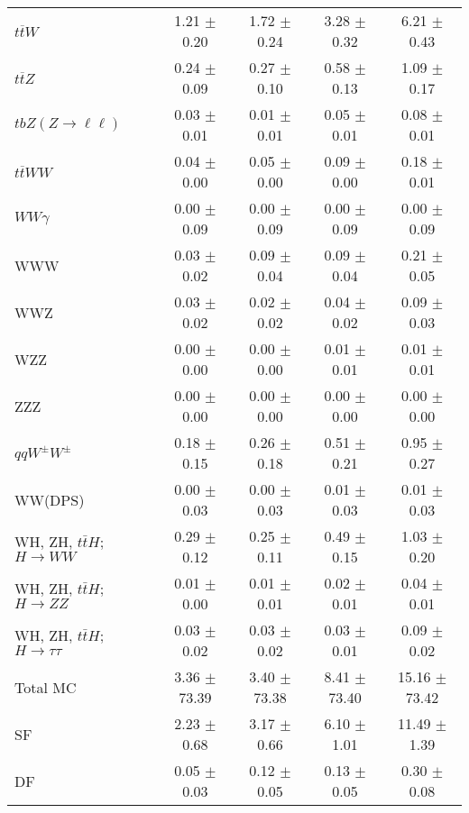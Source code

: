 \begin{tabular}{l|cccc}
                   $t\overline{t}W$ &  1.21 $\pm$  0.20 &  1.72 $\pm$  0.24 &  3.28 $\pm$  0.32 &  6.21 $\pm$  0.43 \\
                   $t\overline{t}Z$ &  0.24 $\pm$  0.09 &  0.27 $\pm$  0.10 &  0.58 $\pm$  0.13 &  1.09 $\pm$  0.17 \\
    $tbZ (Z \rightarrow \ell \ell)$ &  0.03 $\pm$  0.01 &  0.01 $\pm$  0.01 &  0.05 $\pm$  0.01 &  0.08 $\pm$  0.01 \\
                  $t\overline{t}WW$ &  0.04 $\pm$  0.00 &  0.05 $\pm$  0.00 &  0.09 $\pm$  0.00 &  0.18 $\pm$  0.01 \\
                         $WW\gamma$ &  0.00 $\pm$  0.09 &  0.00 $\pm$  0.09 &  0.00 $\pm$  0.09 &  0.00 $\pm$  0.09 \\
                                WWW &  0.03 $\pm$  0.02 &  0.09 $\pm$  0.04 &  0.09 $\pm$  0.04 &  0.21 $\pm$  0.05 \\
                                WWZ &  0.03 $\pm$  0.02 &  0.02 $\pm$  0.02 &  0.04 $\pm$  0.02 &  0.09 $\pm$  0.03 \\
                                WZZ &  0.00 $\pm$  0.00 &  0.00 $\pm$  0.00 &  0.01 $\pm$  0.01 &  0.01 $\pm$  0.01 \\
                                ZZZ &  0.00 $\pm$  0.00 &  0.00 $\pm$  0.00 &  0.00 $\pm$  0.00 &  0.00 $\pm$  0.00 \\
                 $qqW^{\pm}W^{\pm}$ &  0.18 $\pm$  0.15 &  0.26 $\pm$  0.18 &  0.51 $\pm$  0.21 &  0.95 $\pm$  0.27 \\
                            WW(DPS) &  0.00 $\pm$  0.03 &  0.00 $\pm$  0.03 &  0.01 $\pm$  0.03 &  0.01 $\pm$  0.03 \\
WH, ZH, $t\bar{t}H$; $H \rightarrow WW$ &  0.29 $\pm$  0.12 &  0.25 $\pm$  0.11 &  0.49 $\pm$  0.15 &  1.03 $\pm$  0.20 \\
WH, ZH, $t\bar{t}H$; $H \rightarrow ZZ$ &  0.01 $\pm$  0.00 &  0.01 $\pm$  0.01 &  0.02 $\pm$  0.01 &  0.04 $\pm$  0.01 \\
WH, ZH, $t\bar{t}H$; $H \rightarrow \tau\tau$ &  0.03 $\pm$  0.02 &  0.03 $\pm$  0.02 &  0.03 $\pm$  0.01 &  0.09 $\pm$  0.02 \\
\hline\hline
                           Total MC &  3.36 $\pm$ 73.39 &  3.40 $\pm$ 73.38 &  8.41 $\pm$ 73.40 & 15.16 $\pm$ 73.42 \\
\hline
                                 SF &  2.23 $\pm$  0.68 &  3.17 $\pm$  0.66 &  6.10 $\pm$  1.01 & 11.49 $\pm$  1.39 \\
                                 DF &  0.05 $\pm$  0.03 &  0.12 $\pm$  0.05 &  0.13 $\pm$  0.05 &  0.30 $\pm$  0.08 \\

\end{tabular}
